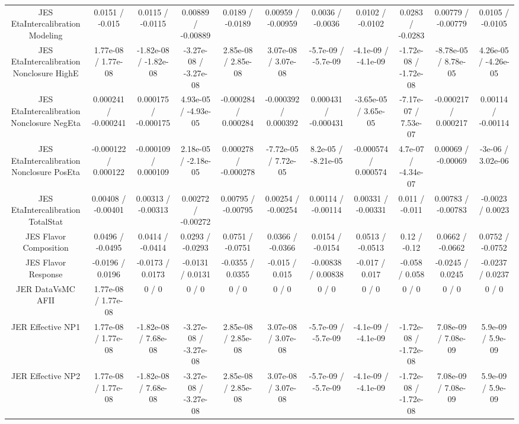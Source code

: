 \begin{table}[htbp]
\begin{center}
\begin{tabular}{|c|c|c|c|c|c|c|c|c|c|c|}
  JES EtaIntercalibration Modeling & 0.0151 / -0.015 & 0.0115 / -0.0115 & 0.00889 / -0.00889 & 0.0189 / -0.0189 & 0.00959 / -0.00959 & 0.0036 / -0.0036 & 0.0102 / -0.0102 & 0.0283 / -0.0283 & 0.00779 / -0.00779 & 0.0105 / -0.0105 \\ 
  JES EtaIntercalibration Nonclosure HighE & 1.77e-08 / 1.77e-08 & -1.82e-08 / -1.82e-08 & -3.27e-08 / -3.27e-08 & 2.85e-08 / 2.85e-08 & 3.07e-08 / 3.07e-08 & -5.7e-09 / -5.7e-09 & -4.1e-09 / -4.1e-09 & -1.72e-08 / -1.72e-08 & -8.78e-05 / 8.78e-05 & 4.26e-05 / -4.26e-05 \\ 
  JES EtaIntercalibration Nonclosure NegEta & 0.000241 / -0.000241 & 0.000175 / -0.000175 & 4.93e-05 / -4.93e-05 & -0.000284 / 0.000284 & -0.000392 / 0.000392 & 0.000431 / -0.000431 & -3.65e-05 / 3.65e-05 & -7.17e-07 / 7.53e-07 & -0.000217 / 0.000217 & 0.00114 / -0.00114 \\ 
  JES EtaIntercalibration Nonclosure PosEta & -0.000122 / 0.000122 & -0.000109 / 0.000109 & 2.18e-05 / -2.18e-05 & 0.000278 / -0.000278 & -7.72e-05 / 7.72e-05 & 8.2e-05 / -8.21e-05 & -0.000574 / 0.000574 & 4.7e-07 / -4.34e-07 & 0.00069 / -0.00069 & -3e-06 / 3.02e-06 \\ 
  JES EtaIntercalibration TotalStat & 0.00408 / -0.00401 & 0.00313 / -0.00313 & 0.00272 / -0.00272 & 0.00795 / -0.00795 & 0.00254 / -0.00254 & 0.00114 / -0.00114 & 0.00331 / -0.00331 & 0.011 / -0.011 & 0.00783 / -0.00783 & -0.0023 / 0.0023 \\ 
  JES Flavor Composition & 0.0496 / -0.0495 & 0.0414 / -0.0414 & 0.0293 / -0.0293 & 0.0751 / -0.0751 & 0.0366 / -0.0366 & 0.0154 / -0.0154 & 0.0513 / -0.0513 & 0.12 / -0.12 & 0.0662 / -0.0662 & 0.0752 / -0.0752 \\ 
  JES Flavor Response & -0.0196 / 0.0196 & -0.0173 / 0.0173 & -0.0131 / 0.0131 & -0.0355 / 0.0355 & -0.015 / 0.015 & -0.00838 / 0.00838 & -0.017 / 0.017 & -0.058 / 0.058 & -0.0245 / 0.0245 & -0.0237 / 0.0237 \\ 
  JER DataVsMC AFII & 1.77e-08 / 1.77e-08 & 0 / 0 & 0 / 0 & 0 / 0 & 0 / 0 & 0 / 0 & 0 / 0 & 0 / 0 & 0 / 0 & 0 / 0 \\ 
  JER Effective NP1 & 1.77e-08 / 1.77e-08 & -1.82e-08 / 7.68e-08 & -3.27e-08 / -3.27e-08 & 2.85e-08 / 2.85e-08 & 3.07e-08 / 3.07e-08 & -5.7e-09 / -5.7e-09 & -4.1e-09 / -4.1e-09 & -1.72e-08 / -1.72e-08 & 7.08e-09 / 7.08e-09 & 5.9e-09 / 5.9e-09 \\ 
  JER Effective NP2 & 1.77e-08 / 1.77e-08 & -1.82e-08 / 7.68e-08 & -3.27e-08 / -3.27e-08 & 2.85e-08 / 2.85e-08 & 3.07e-08 / 3.07e-08 & -5.7e-09 / -5.7e-09 & -4.1e-09 / -4.1e-09 & -1.72e-08 / -1.72e-08 & 7.08e-09 / 7.08e-09 & 5.9e-09 / 5.9e-09 \\ 

\end{tabular}
\end{center}
\end{table}
